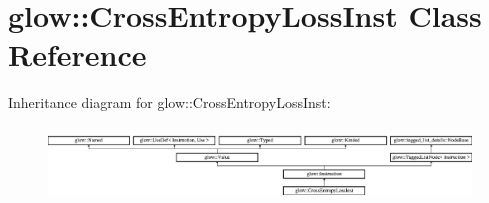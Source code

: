 \hypertarget{classglow_1_1_cross_entropy_loss_inst}{}\section{glow\+:\+:Cross\+Entropy\+Loss\+Inst Class Reference}
\label{classglow_1_1_cross_entropy_loss_inst}
Inheritance diagram for glow\+:\+:Cross\+Entropy\+Loss\+Inst\+:\begin{figure}[H]
\begin{center}
\leavevmode
\includegraphics[height=1.991111cm]{classglow_1_1_cross_entropy_loss_inst}
\end{center}
\end{figure}
